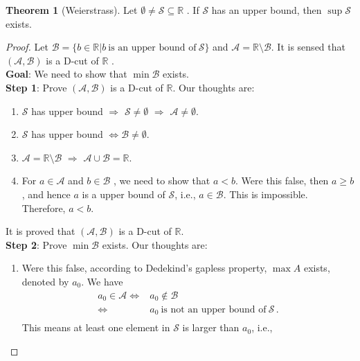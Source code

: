\documentclass{book}
\theoremstyle{definition}
\newtheorem{theorem}{Theorem}[section]
\begin{document}
\begin{theorem}[Weierstrass]
Let $\emptyset\neq\mathcal{S}\subseteq\mathbb{R}$ . If $\mathcal{S}$ has an upper bound, then $\sup \mathcal{S}$ exists.
\end{theorem}
\begin{proof}
Let $\mathcal{B}=\{b\in\mathbb{R} | b~\text{is an upper bound of}~ \mathcal{S}\}$ and $\mathcal{A}=\mathbb{R}\setminus\mathcal{B}$. It is sensed that $(\mathcal{A}, \mathcal{B})$ is a D-cut of $\mathbb{R}$ .\\
\textbf{Goal}: We need to show that $\min \mathcal{B}$ exists.\\
\textbf{Step 1}:  Prove $(\mathcal{A}, \mathcal{B})$ is a D-cut of $\mathbb{R}$. Our thoughts are:
\begin{enumerate}
    \item $\mathcal{S}$ has upper bound $\Rightarrow$ $\mathcal{S}\neq\emptyset$ $\Rightarrow$ $\mathcal{A}\neq\emptyset$.
    \item $\mathcal{S}$ has upper bound $\Leftrightarrow$$\mathcal{B}\neq\emptyset$.
    \item $\mathcal{A}=\mathbb{R}\setminus\mathcal{B}$ $\Rightarrow$ $\mathcal{A}\cup\mathcal{B}=\mathbb{R}$.
    \item For $a\in \mathcal{A}$ and $b\in\mathcal{B}$ , we need to show that $a<b$. Were this false, then $a\geq b$ , and hence $a$ is a upper bound of $\mathcal{S}$, i.e., $a\in\mathcal{B}$. This is impossible. Therefore, $a<b$.
\end{enumerate}
It is proved that $(\mathcal{A}, \mathcal{B})$ is a D-cut of $\mathbb{R}$.\\
\textbf{Step 2}: Prove $\min \mathcal{B}$ exists. Our thoughts are:
\begin{enumerate}
    \item Were this false, according to Dedekind's gapless property, $\max A$ exists, denoted by $a_0$. We have
    \begin{equation}
    \begin{aligned}
        a_0\in \mathcal{A} \Leftrightarrow & a_0 \not\in \mathcal{B} \\
                            \Leftrightarrow & a_0~\text{is not an upper bound of}~\mathcal{S} \,.\\
    \end{aligned}
    \end{equation}
    This means at least one element in $\mathcal{S}$ is larger than $a_0$, i.e.,
    \begin{equation}

\end{equation}
\end{enumerate}
\end{proof}
\end{document}
